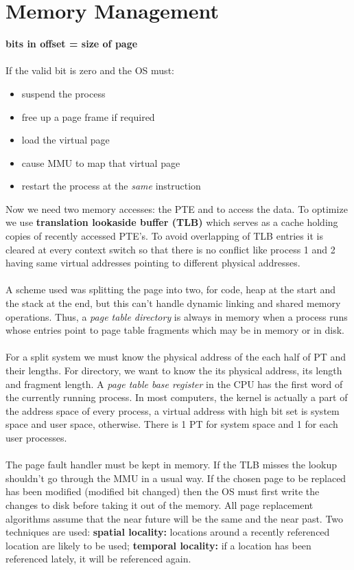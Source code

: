 \documentclass[twoside]{article}
\begin{document}
\section{Memory Management}
\textbf{bits in offset = size of page}\\ \\
If the valid bit is zero and the OS must:
\begin{itemize}
\item suspend the process
\item free up a page frame if required
\item load the virtual page
\item cause MMU to map that virtual page
\item restart the process at the \emph{same} instruction
\end{itemize}
Now we need two memory accesses: the PTE and to access the data. To optimize we use \textbf{translation lookaside buffer (TLB)} which serves as a cache holding copies of recently accessed PTE's. To avoid overlapping of TLB entries it is cleared at every context switch so that there is no conflict like process 1 and 2 having same virtual addresses pointing to different physical addresses.\\ \\
A scheme used was splitting the page into two, for code, heap at the start and the stack at the end, but this can't handle dynamic linking and shared memory operations. Thus, a \emph{page table directory} is always in memory when a process runs whose entries point to page table fragments which may be in memory or in disk. \\ \\
For a split system we must know the physical address of the each half of PT and their lengths. For directory, we want to know the its physical address, its length and fragment length. A \emph{page table base register} in the CPU has the first word of the currently running process. In most computers, the kernel is actually a part of the address space of every process, a virtual address with high bit set is system space and user space, otherwise. There is 1 PT for system space and 1 for each user processes.\\ \\
The page fault handler must be kept in memory. If the TLB misses the lookup shouldn't go through the MMU in a usual way. If the chosen page to be replaced has been modified (modified bit changed) then the OS must first write the changes to disk before taking it out of the memory. All page replacement algorithms assume that the near future will be the same and the near past. Two techniques are used: \textbf{spatial locality:} locations around a recently referenced location are likely to be used; \textbf{temporal locality:} if a location has been referenced lately, it will be referenced again.\\ \\
\end{document}

